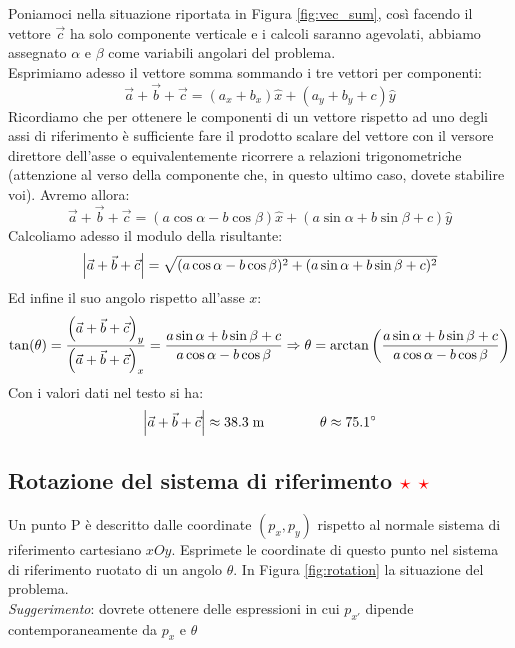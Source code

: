 \documentclass[12pt,a4paper]{book}
\newcommand{\rstar}{ \textcolor{red}{$\star$}}
\begin{document}
Poniamoci nella situazione riportata in Figura \ref{fig:vec_sum}, così facendo il vettore $\vec{c}$ ha solo componente verticale e i calcoli saranno agevolati, abbiamo assegnato $\alpha$ e $\beta$ come variabili angolari del problema.\\
Esprimiamo adesso il vettore somma sommando i tre vettori per componenti:
%
\begin{equation*}
\vec{a}+\vec{b}+\vec{c}=(a_x+b_x)\hat{x}+(a_y+b_y+c)\hat{y}
\end{equation*}
%
Ricordiamo che per ottenere le componenti di un vettore rispetto ad uno degli assi di riferimento è sufficiente fare il prodotto scalare del vettore con il versore direttore dell'asse o equivalentemente ricorrere a relazioni trigonometriche (attenzione al verso della componente che, in questo ultimo caso, dovete stabilire voi). Avremo allora:
%
\begin{equation*}
\vec{a}+\vec{b}+\vec{c}=(a\cos\alpha-b\cos\beta)\hat{x}+(a\sin\alpha+b\sin\beta+c)\hat{y}
\end{equation*}
%
Calcoliamo adesso il modulo della risultante:
%
\begin{equation*}
\qty|\vec{a}+\vec{b}+\vec{c}|=\sqrt{(a\cos\alpha-b\cos\beta)^2+(a\sin\alpha+b\sin\beta+c)^2}
\end{equation*}
%
Ed infine il suo angolo rispetto all'asse $x$:
%
\begin{equation*}
\tan(\theta)= \frac{\qty(\vec{a}+\vec{b}+\vec{c})_y}{\qty(\vec{a}+\vec{b}+\vec{c})_x} =\frac{a\sin\alpha+b\sin\beta+c}{a\cos\alpha-b\cos\beta} \Rightarrow \theta= \arctan \qty( \frac{a\sin\alpha+b\sin\beta+c}{a\cos\alpha-b\cos\beta})
\end{equation*}
%
Con i valori dati nel testo si ha:
%
\begin{equation*}
\qty|\vec{a}+\vec{b}+\vec{c}|\approx 38.3\;\text{m} \qquad \qquad \theta \approx 75.1\degree
\end{equation*}
%

\subsection{Rotazione del sistema di riferimento \rstar\rstar}
Un punto P è descritto dalle coordinate $(p_x, p_y)$ rispetto al normale sistema di riferimento cartesiano $xOy$. Esprimete le coordinate di questo punto nel sistema di riferimento ruotato di un angolo $\theta$. In Figura \ref{fig:rotation} la situazione del problema. \\
\textit{Suggerimento}: dovrete ottenere delle espressioni in cui $p_{x'}$ dipende contemporaneamente da $p_x$ e $\theta$
\end{document}
